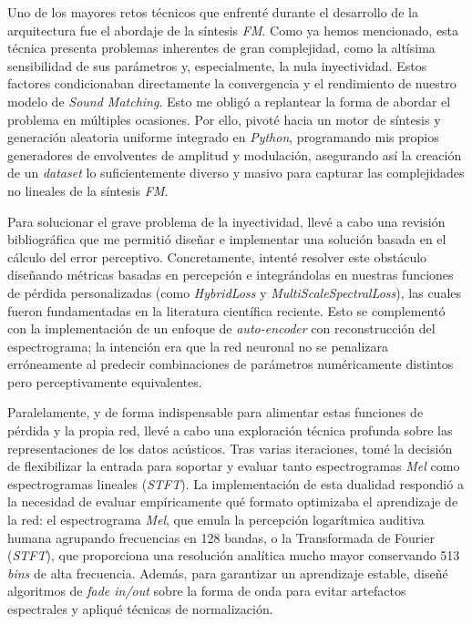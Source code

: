 Uno de los mayores retos técnicos que enfrenté durante el desarrollo de la arquitectura fue el abordaje de la síntesis \textit{FM}. Como ya hemos mencionado, esta técnica presenta problemas inherentes de gran complejidad, como la altísima sensibilidad de sus parámetros y, especialmente, la nula inyectividad. Estos factores condicionaban directamente la convergencia y el rendimiento de nuestro modelo de \textit{Sound Matching}. Esto me obligó a replantear la forma de abordar el problema en múltiples ocasiones. Por ello, pivoté hacia un motor de síntesis y generación aleatoria uniforme integrado en \textit{Python}, programando mis propios generadores de envolventes de amplitud y modulación, asegurando así la creación de un \textit{dataset} lo suficientemente diverso y masivo para capturar las complejidades no lineales de la síntesis \textit{FM}.

Para solucionar el grave problema de la inyectividad, llevé a cabo una revisión bibliográfica que me permitió diseñar e implementar una solución basada en el cálculo del error perceptivo. Concretamente, intenté resolver este obstáculo diseñando métricas basadas en percepción e integrándolas en nuestras funciones de pérdida personalizadas (como \textit{HybridLoss} y \textit{MultiScaleSpectralLoss}), las cuales fueron fundamentadas en la literatura científica reciente. Esto se complementó con la implementación de un enfoque de \textit{auto-encoder} con reconstrucción del espectrograma; la intención era que la red neuronal no se penalizara erróneamente al predecir combinaciones de parámetros numéricamente distintos pero perceptivamente equivalentes.

Paralelamente, y de forma indispensable para alimentar estas funciones de pérdida y la propia red, llevé a cabo una exploración técnica profunda sobre las representaciones de los datos acústicos. Tras varias iteraciones, tomé la decisión de flexibilizar la entrada para soportar y evaluar tanto espectrogramas \textit{Mel} como espectrogramas lineales (\textit{STFT}). La implementación de esta dualidad respondió a la necesidad de evaluar empíricamente qué formato optimizaba el aprendizaje de la red: el espectrograma \textit{Mel}, que emula la percepción logarítmica auditiva humana agrupando frecuencias en 128 bandas, o la Transformada de Fourier (\textit{STFT}), que proporciona una resolución analítica mucho mayor conservando 513 \textit{bins} de alta frecuencia. Además, para garantizar un aprendizaje estable, diseñé algoritmos de \textit{fade in/out} sobre la forma de onda para evitar artefactos espectrales y apliqué técnicas de normalización.

